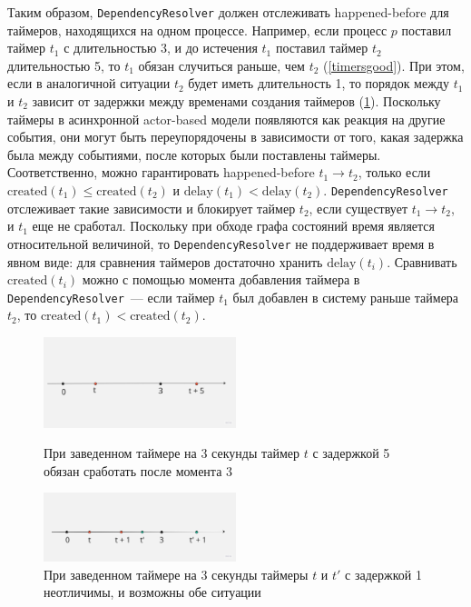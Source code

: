 \documentclass[a4paper,12pt]{extarticle}
\begin{document}
Таким образом, \texttt{DependencyResolver} должен отслеживать happened-before для таймеров, находящихся на одном процессе.
Например, если процесс $p$ поставил таймер $t_1$ с длительностью 3, и до истечения $t_1$ поставил таймер $t_2$ длительностью 5, то $t_1$ обязан случиться раньше, чем $t_2$ (\cref{timersgood}).
При этом, если в аналогичной ситуации $t_2$ будет иметь длительность 1, то порядок между $t_1$ и $t_2$ зависит от задержки между временами создания таймеров (\cref{timersbad}).
Поскольку таймеры в асинхронной actor-based модели появляются как реакция на другие события, они могут быть переупорядочены в зависимости от того, какая задержка была между событиями, после которых были поставлены таймеры.
Соответственно, можно гарантировать happened-before $t_1 \to t_2$, только если $\text{created}(t_1) \le \text{created}(t_2)$ и $\text{delay}(t_1) < \text{delay}(t_2)$.
\texttt{DependencyResolver} отслеживает такие зависимости и блокирует таймер $t_2$, если существует $t_1 \to t_2$, и $t_1$ еще не сработал.
Поскольку при обходе графа состояний время является относительной величиной, то \texttt{DependencyResolver} не поддерживает время в явном виде: для сравнения таймеров достаточно хранить $\text{delay}(t_i)$.
Сравнивать $\text{created}(t_i)$ можно с помощью момента добавления таймера в \texttt{DependencyResolver}~--- если таймер $t_1$ был добавлен в систему раньше таймера $t_2$, то
$\text{created}(t_1) < \text{created}(t_2)$. 


\begin{figure}
    \begin{center}
        \includegraphics[width=0.5\textwidth]{img/dependency_resolvable.jpg}
        \caption{При заведенном таймере на 3 секунды таймер $t$ с задержкой 5 обязан сработать после момента 3}
        \label{timersgood}
    \end{center}
    \begin{center}
            \includegraphics[width=0.5\textwidth]{img/dependency_unresolvable.jpg}
        \caption{При заведенном таймере на 3 секунды таймеры $t$ и $t'$ с задержкой 1 неотличимы, и возможны обе ситуации}
        \label{timersbad}
    \end{center}
\end{figure}
\end{document}
